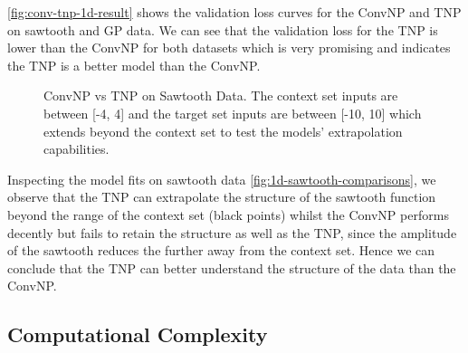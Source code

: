 \documentclass[../../main.tex]{subfiles}
\begin{document}
\autoref{fig:conv-tnp-1d-result} shows the validation loss curves for the ConvNP and TNP on sawtooth and GP data. We can see that the validation loss for the TNP is lower than the ConvNP for both datasets which is very promising and indicates the TNP is a better model than the ConvNP. 


\begin{figure}[H]
	\centering
	\qquad
	\caption{ConvNP vs TNP on Sawtooth Data. The context set inputs are between [-4, 4] and the target set inputs are between [-10, 10] which extends beyond the context set to test the models' extrapolation capabilities.} 
	\label{fig:1d-sawtooth-comparisons}
\end{figure}

Inspecting the model fits on sawtooth data \autoref{fig:1d-sawtooth-comparisons}, we observe that the TNP can extrapolate the structure of the sawtooth function beyond the range of the context set (black points) whilst the ConvNP performs decently but fails to retain the structure as well as the TNP, since the amplitude of the sawtooth reduces the further away from the context set. Hence we can conclude that the TNP can better understand the structure of the data than the ConvNP.

\subsection{Computational Complexity}
\end{document}
